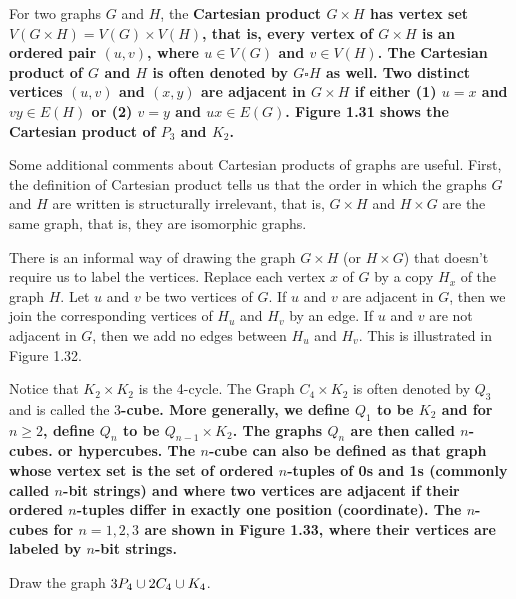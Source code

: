 

For two graphs $G$ and $H$, the \bf{Cartesian product} $G \times H$ has vertex set $V(G \times H) = V(G) \times V(H)$, that is, every vertex of $G \times H$ is an ordered pair $(u,v)$, where $u \in V(G)$ and $v \in V(H)$. The Cartesian product of $G$ and $H$ is often denoted by $G \square H$ as well. Two distinct vertices $(u,v)$ and $(x,y)$ are adjacent in $G \times H$ if either (1) $u=x$ and $vy \in E(H)$ or (2) $v=y$ and $ux \in E(G)$. Figure 1.31 shows the Cartesian product of $P_{3}$ and $K_{2}$.



Some additional comments about Cartesian products of graphs are useful. First, the definition of Cartesian product tells us that the order in which the graphs $G$ and $H$ are written is structurally irrelevant, that is, $G \times H$ and $H \times G$ are the same graph, that is, they are isomorphic graphs.

There is an informal way of drawing the graph $G \times H$ (or $H \times G$) that doesn't require us to label the vertices. Replace each vertex $x$ of $G$ by a copy $H_{x}$ of the graph $H$. Let $u$ and $v$ be two vertices of $G$. If $u$ and $v$ are adjacent in $G$, then we join the corresponding vertices of $H_{u}$ and $H_{v}$ by an edge. If $u$ and $v$ are not adjacent in $G$, then we add no edges between $H_{u}$ and $H_{v}$. This is illustrated in Figure 1.32.



Notice that $K_{2} \times K_{2}$ is the 4-cycle. The Graph $C_{4} \times K_{2}$ is often denoted by $Q_{3}$ and is called the 3\bf{-cube}. More generally, we define $Q_{1}$ to be $K_{2}$ and for $n \geq 2$, define $Q_{n}$ to be $Q_{n-1} \times K_{2}$. The graphs $Q_{n}$ are then called $n$\bf{-cubes}. or \bf{hypercubes}. The $n$-cube can also be defined as that graph whose vertex set is the set of ordered $n$-tuples of 0s and 1s (commonly called $n$\bf{-bit strings}) and where two vertices are adjacent if their ordered $n$-tuples differ in exactly one position (coordinate). The $n$-cubes for $n = 1,2,3$ are shown in Figure 1.33, where their vertices are labeled by $n$-bit strings.



\begin{exers}\end{exers}

\begin{exer}
Draw the graph $3P_{4} \cup 2C_{4} \cup K_{4}$.
\end{exer}

